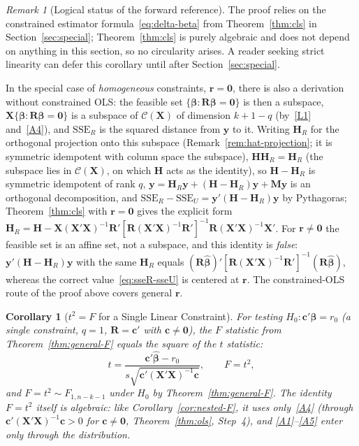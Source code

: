 \documentclass[14pt]{extarticle}
\theoremstyle{plain}
\newtheorem{corollary}[theorem]{Corollary}
\theoremstyle{definition}
\theoremstyle{remark}
\newtheorem{remark}[theorem]{Remark}
\newcommand{\SSE}{\mathrm{SSE}}
\newcommand{\bX}{\mathbf{X}}
\newcommand{\by}{\mathbf{y}}
\def\bb{\boldsymbol{\beta}}
\newcommand{\bH}{\mathbf{H}}
\newcommand{\bM}{\mathbf{M}}
\newcommand{\bR}{\mathbf{R}}
\newcommand{\br}{\mathbf{r}}
\def\bc{\mathbf{c}}
\newcommand{\bzero}{\mathbf{0}}
\newcommand{\calC}{\mathcal{C}}
\begin{document}
\begin{remark}[Logical status of the forward reference]\label{rem:forward-nestedF}
The proof relies on the constrained estimator formula~\eqref{eq:delta-beta} from Theorem~\ref{thm:cls} in Section~\ref{sec:special}; Theorem~\ref{thm:cls} is purely algebraic and does not depend on anything in this section, so no circularity arises. A reader seeking strict linearity can defer this corollary until after Section~\ref{sec:special}.

In the special case of \emph{homogeneous} constraints, $\br = \bzero$, there is also a derivation without constrained OLS: the feasible set $\{\bb : \bR\bb = \bzero\}$ is then a subspace, $\bX\{\bb : \bR\bb = \bzero\}$ is a subspace of $\calC(\bX)$ of dimension $k + 1 - q$ (by~\ref{L1} and~\ref{A4}), and $\SSE_R$ is the squared distance from $\by$ to it. Writing $\bH_R$ for the orthogonal projection onto this subspace (Remark~\ref{rem:hat-projection}; it is symmetric idempotent with column space the subspace), $\bH\bH_R = \bH_R$ (the subspace lies in $\calC(\bX)$, on which $\bH$ acts as the identity), so $\bH - \bH_R$ is symmetric idempotent of rank $q$, $\by = \bH_R\by + (\bH - \bH_R)\by + \bM\by$ is an orthogonal decomposition, and $\SSE_R - \SSE_U = \by'(\bH - \bH_R)\by$ by Pythagoras; Theorem~\ref{thm:cls} with $\br = \bzero$ gives the explicit form $\bH_R = \bH - \bX(\bX'\bX)^{-1}\bR'[\bR(\bX'\bX)^{-1}\bR']^{-1}\bR(\bX'\bX)^{-1}\bX'$. For $\br \neq \bzero$ the feasible set is an affine set, not a subspace, and this identity is \emph{false}: $\by'(\bH - \bH_R)\by$ with the same $\bH_R$ equals $(\bR\hat{\bb})'[\bR(\bX'\bX)^{-1}\bR']^{-1}(\bR\hat{\bb})$, whereas the correct value~\eqref{eq:sseR-sseU} is centered at $\br$. The constrained-OLS route of the proof above covers general $\br$.
\end{remark}

\begin{corollary}[$t^2 = F$ for a Single Linear Constraint]\label{cor:t2F}
For testing $H_0\colon \bc'\bb = r_0$ (a single constraint, $q = 1$, $\bR = \bc'$ with $\bc \neq \bzero$), the $F$ statistic from Theorem~\ref{thm:general-F} equals the square of the $t$ statistic:
\[
t = \frac{\bc'\hat{\bb} - r_0}{s\sqrt{\bc'(\bX'\bX)^{-1}\bc}}, \qquad F = t^2,
\]
and $F = t^2 \sim F_{1, n-k-1}$ under $H_0$ by Theorem~\ref{thm:general-F}. The identity $F = t^2$ itself is algebraic: like Corollary~\ref{cor:nested-F}, it uses only~\ref{A4} (through $\bc'(\bX'\bX)^{-1}\bc > 0$ for $\bc \neq \bzero$, Theorem~\ref{thm:ols}, Step~4), and \ref{A1}--\ref{A5} enter only through the distribution.
\end{corollary}
\end{document}
